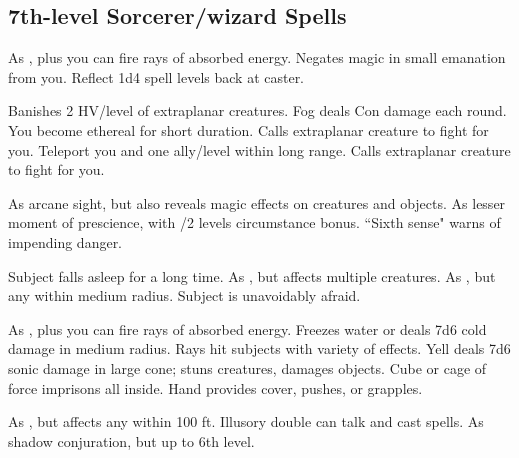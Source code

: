 \subsection{7th-level Sorcerer/wizard Spells}
\begin{swspelllist}
   As , plus you can fire rays of absorbed energy.
  \spellhead{}
   Negates magic in small emanation from you.
   Reflect 1d4 spell levels back at caster.

   Banishes 2 HV/level of extraplanar creatures.
   Fog deals Con damage each round.
   You become ethereal for short duration.
   Calls extraplanar creature to fight for you.
   Teleport you and one ally/level within long range.
   Calls extraplanar creature to fight for you.

   As arcane sight, but also reveals magic effects on creatures and objects.
   As lesser moment of prescience, with /2 levels circumstance bonus.
   ``Sixth sense" warns of impending danger.
  \spellheadrestricted{}

   Subject falls asleep for a long time.
   As , but affects multiple creatures.
   As , but any within medium radius.
   Subject is unavoidably afraid.

   As , plus you can fire rays of absorbed energy.
   Freezes water or deals 7d6 cold damage in medium radius.
   Rays hit subjects with variety of effects.
   Yell deals 7d6 sonic damage in large cone; stuns creatures, damages objects.
  \M Cube or cage of force imprisons all inside.
   Hand provides cover, pushes, or grapples.

   As , but affects any within 100 ft.
   Illusory double can talk and cast spells.
   As shadow conjuration, but up to 6th level.


\end{swspelllist}
